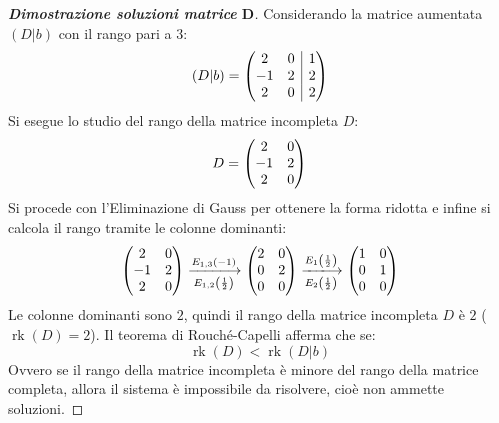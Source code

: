 \documentclass[a4paper]{article}
\makeatletter
\DeclareMathOperator{\rk}{rk}
\newenvironment{rowequmat}[1]{\left(\array{@{}#1@{}}}{\endarray\right)}
\makeatother
\begin{document}
	\begin{proof}[\textbf{Dimostrazione soluzioni matrice} $\boldsymbol{D}$]
		Considerando la matrice aumentata $\left(D|b\right)$ con il rango pari a $3$:
		\begin{equation*}
			\left(D|b\right) = \begin{rowequmat}{cc|c}
				2 & 0 & 1 \\
				-1 & 2 & 2 \\
				2 & 0 & 2
			\end{rowequmat}
		\end{equation*}
		Si esegue lo studio del rango della matrice incompleta $D$:
		\begin{equation*}
			D = \begin{rowequmat}{cc}
				2 & 0 \\
				-1 & 2 \\
				2 & 0
			\end{rowequmat}
		\end{equation*}
		Si procede con l'Eliminazione di Gauss per ottenere la forma ridotta e infine si calcola il rango tramite le colonne dominanti:
		\begin{gather*}
			\begin{rowequmat}{cc}
				2 & 0 \\
				-1 & 2 \\
				2 & 0
			\end{rowequmat} \xlongrightarrow[E_{1,2}\left(\frac{1}{2}\right)]{E_{1,3}\left(-1\right)}
			\begin{rowequmat}{cc}
				2 & 0 \\
				0 & 2 \\
				0 & 0
			\end{rowequmat} \xlongrightarrow[E_{2}\left(\frac{1}{2}\right)]{E_{1}\left(\frac{1}{2}\right)}
			\begin{rowequmat}{cc}
				1 & 0 \\
				0 & 1 \\
				0 & 0
			\end{rowequmat}
		\end{gather*}
		Le colonne dominanti sono $2$, quindi il rango della matrice incompleta $D$ è $2$ ($\rk\left(D\right) = 2$). Il teorema di Rouché-Capelli afferma che se:
		\begin{equation*}
			\rk\left(D\right) < \rk\left(D|b\right)
		\end{equation*}
		Ovvero se il rango della matrice incompleta è minore del rango della matrice completa, allora il sistema è impossibile da risolvere, cioè non ammette soluzioni.
	\end{proof}\newpage
\end{document}
